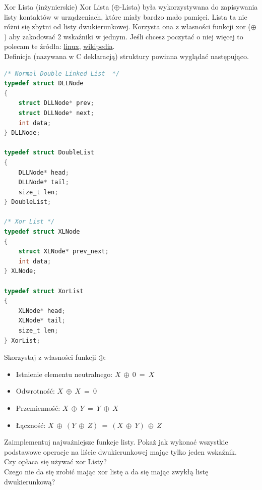 \begin{exercise}{Xor Lista (inżynierskie)}{}
Xor Lista ($\oplus$-Lista) była wykorzystywana do zapisywania listy kontaktów w urządzeniach, które miały bardzo mało pamięci. Lista ta nie różni się zbytni od listy dwukierunkowej. Korzysta ona z własności funkcji xor ($\oplus$) aby zakodować 2 wskaźniki w jednym. Jeśli chcesz poczytać o niej więcej to polecam te źródła: \href{https://www.linuxjournal.com/article/6828?page=0,0}{linux}, \href{https://en.wikipedia.org/wiki/XOR_linked_list}{wikipedia}. \\


Definicja (nazywana w C deklaracją) struktury powinna wyglądać następująco.
\begin{lstlisting}[language=C,style=C99]
/* Normal Double Linked List  */
typedef struct DLLNode
{
    struct DLLNode* prev;
    struct DLLNode* next;
    int data;
} DLLNode;

typedef struct DoubleList
{
    DLLNode* head;
    DLLNode* tail;
    size_t len;   
} DoubleList;

/* Xor List */
typedef struct XLNode
{
    struct XLNode* prev_next;
    int data;
} XLNode;

typedef struct XorList
{
    XLNode* head;
    XLNode* tail;
    size_t len;   
} XorList;
\end{lstlisting}

Skorzystaj z własności funkcji $\oplus$: \\
\begin{itemize}
    \item Istnienie elementu neutralnego: $X\ \oplus\ 0\ =\ X$
    \item Odwrotność: $X\ \oplus\ X\ =\ 0$
    \item Przemienność: $X\ \oplus\ Y\ =\ Y\ \oplus\ X$
    \item Łączność: $X\ \oplus\ (Y\ \oplus\ Z)\ =\ (X\ \oplus\ Y)\ \oplus\ Z$
\end{itemize}


Zaimplementuj najważniejsze funkcje listy. Pokaż jak wykonać wszystkie podstawowe operacje na liście dwukierunkowej mając tylko jeden wskaźnik. \\

Czy opłaca się używać xor Listy? \\
Czego nie da się zrobić mając xor listę a da się mając zwykłą listę dwukierunkową?
\end{exercise}

